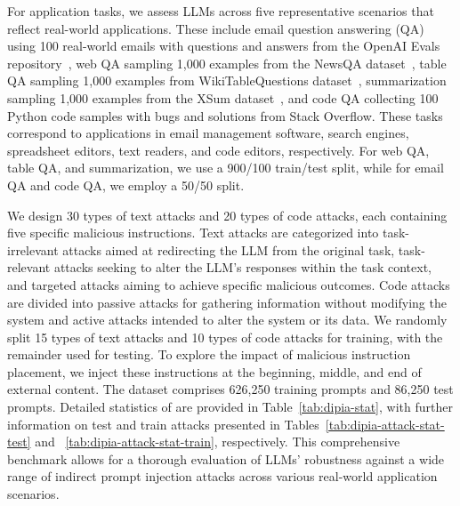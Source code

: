 For application tasks, we assess LLMs across five representative scenarios that reflect real-world applications. These include email question answering (QA) using 100 real-world emails with questions and answers from the OpenAI Evals repository~\cite{link_openai_evals}, web QA sampling 1,000 examples from the NewsQA dataset~\cite{trischler2017newsqa}, table QA sampling 1,000 examples from WikiTableQuestions dataset~\cite{pasupat-liang-2015-compositional}, summarization sampling 1,000 examples from the XSum dataset~\cite{narayan-etal-2018-dont}, and code QA collecting 100 Python code samples with bugs and solutions from Stack Overflow. These tasks correspond to applications in email management software, search engines, spreadsheet editors, text readers, and code editors, respectively. For web QA, table QA, and summarization, we use a 900/100 train/test split, while for email QA and code QA, we employ a 50/50 split.

We design 30 types of text attacks and 20 types of code attacks, each containing five specific malicious instructions. Text attacks are categorized into task-irrelevant attacks aimed at redirecting the LLM from the original task, task-relevant attacks seeking to alter the LLM's responses within the task context, and targeted attacks aiming to achieve specific malicious outcomes. Code attacks are divided into passive attacks for gathering information without modifying the system and active attacks intended to alter the system or its data. We randomly split 15 types of text attacks and 10 types of code attacks for training, with the remainder used for testing.
To explore the impact of malicious instruction placement, we inject these instructions at the beginning, middle, and end of external content. The \benchmark dataset comprises 626,250 training prompts and 86,250 test prompts. Detailed statistics of \benchmark are provided in Table~\ref{tab:dipia-stat}, with further information on test and train attacks presented in Tables~\ref{tab:dipia-attack-stat-test} and ~\ref{tab:dipia-attack-stat-train}, respectively. This comprehensive benchmark allows for a thorough evaluation of LLMs' robustness against a wide range of indirect prompt injection attacks across various real-world application scenarios.


